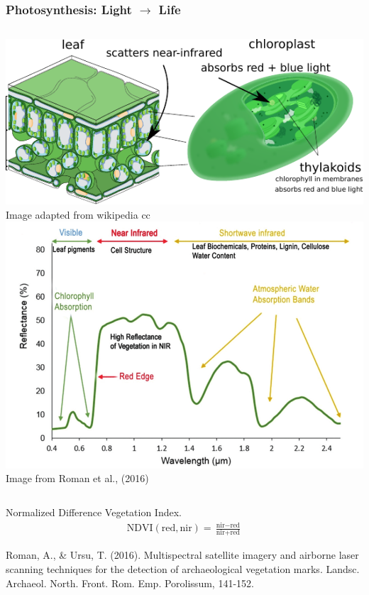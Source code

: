 \documentclass[11pt]{beamer}
\newcommand{\citeapa}[1]{ {\tiny#1\par} }
\begin{document}
	
	\begin{frame}
		\frametitle{Photosynthesis: Light $\rightarrow$ Life}
		
		\begin{columns}[b]
			
			\includegraphics[width=\textwidth]{images/leaf_smallannot.pdf}
			{\tiny Image adapted from wikipedia cc}
			\includegraphics[width=\textwidth]{images/reflectance_vegetation}
			\tiny Image from Roman et al., (2016)
		\end{columns}
		
		\normalsize
		
		\vspace{1em}
		Normalized Difference Vegetation Index.
		\vspace{1em}
		\begin{align}
			\text{NDVI}(\text{red}, \text{nir}) = \frac{\text{nir}-\text{red}}{\text{nir}+\text{red}}
		\end{align}
		
		\vfill
		
		\citeapa{Roman, A., \& Ursu, T. (2016). Multispectral satellite imagery and airborne laser scanning techniques for the detection of archaeological vegetation marks. Landsc. Archaeol. North. Front. Rom. Emp. Porolissum, 141-152.}
		
	\end{frame}
\end{document}
